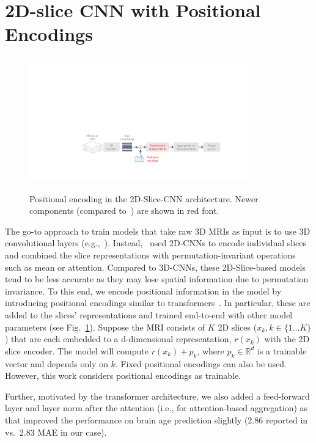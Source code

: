 \section[2D-slice CNN with Positional Encodings]{2D-slice CNN with Positional Encodings}
\begin{figure}
    \centering
    {\includegraphics[width=0.85\textwidth, trim={6cm 2.2cm 3cm 8.9cm},clip]{figures/arch-diagram-med-neurips.pdf}}
    \caption{Positional encoding in the 2D-Slice-CNN architecture. Newer  components (compared to~\cite{gupta2021improved}) are shown in red font.}
    \label{fig:approach}
\end{figure}

The go-to approach to train models that take raw 3D MRIs as input is to use 3D convolutional layers
(e.g.,~\cite{peng2019accurate, hu2020brain, guanLearning2021}).
Instead,~\cite{gupta2021improved} used 2D-CNNs to encode individual slices and combined the slice representations with permutation-invariant operations such as mean or attention. Compared to 3D-CNNs, these 2D-Slice-based models tend to be less accurate as they may lose spatial information due to permutation invariance. To this end, we encode positional information in the model by introducing positional encodings similar to transformers~\cite{vaswani2017attention,dosovitskiy2021image}. In particular, these are added to the slices' representations and trained end-to-end with other model parameters (see Fig.~\ref{fig:approach}). Suppose the MRI consists of $K$ 2D slices ($x_k, k \in \{1\ldots K\}$) that are each embedded to a d-dimensional representation, $r(x_k)$ with the 2D slice encoder. The model will compute $r(x_k)+p_k$, where $p_k \in \mathbb R^d$ is a trainable vector and depends only on $k$. Fixed positional encodings can also be used. However, this work considers positional encodings as trainable.





Further, motivated by the transformer architecture, we also added a feed-forward layer and layer norm after the attention (i.e., for attention-based aggregation) as that improved the performance on brain age prediction slightly (2.86 reported in~\cite{gupta2021improved} vs.\ 2.83 MAE in our case).












